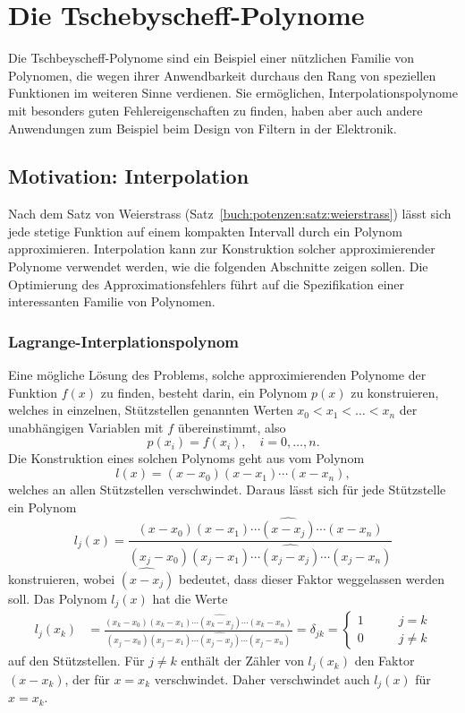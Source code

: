 %
%
%
\section{Die Tschebyscheff-Polynome
\label{buch:polynome:section:tschebyscheff}}
Die Tschbeyscheff-Polynome sind ein Beispiel einer nützlichen Familie
von Polynomen, die wegen ihrer Anwendbarkeit durchaus den Rang von
speziellen Funktionen im weiteren Sinne verdienen.
Sie ermöglichen, Interpolationspolynome mit besonders guten
Fehlereigenschaften zu finden, haben aber auch andere Anwendungen
zum Beispiel beim Design von Filtern in der Elektronik.

%
%
\subsection{Motivation: Interpolation}
Nach dem Satz von Weierstrass
(Satz~\ref{buch:potenzen:satz:weierstrass})
lässt sich jede stetige Funktion auf einem kompakten Intervall durch
ein Polynom approximieren.
Interpolation kann zur Konstruktion solcher approximierender Polynome
verwendet werden, wie die folgenden Abschnitte zeigen sollen.
Die Optimierung des Approximationsfehlers führt auf die Spezifikation
einer interessanten Familie von Polynomen.

%
%
\subsubsection{Lagrange-Interplationspolynom}
Eine mögliche Lösung des Problems, solche approximierenden Polynome
der Funktion $f(x)$
zu finden, besteht darin, ein Polynom $p(x)$ zu konstruieren, welches
in einzelnen, Stützstellen genannten Werten $x_0<x_1<\dots<x_n$ der
unabhängigen Variablen mit $f$ übereinstimmt, also
\[
p(x_i) = f(x_i), \quad i=0,\dots,n.
\]
Die Konstruktion eines solchen Polynoms geht aus vom Polynom
\[
l(x) = (x-x_0)(x-x_1)\cdots(x-x_n),
\]
welches an allen Stützstellen verschwindet.
Daraus lässt sich für jede Stützstelle ein Polynom
\[
l_j(x)
=
\frac{
(x-x_0)(x-x_1)\cdots\widehat{(x-x_j)}\cdots(x-x_n)
}{
(x_j-x_0)(x_j-x_1)\cdots\widehat{(x_j-x_j)}\cdots(x_j-x_n)
}
\]
konstruieren, wobei $\widehat{(x-x_j)}$ bedeutet, dass dieser Faktor
weggelassen werden soll.
Das Polynom $l_j(x)$ hat die Werte
\begin{align}
l_j(x_k)
&=
\frac{
(x_k-x_0)(x_k-x_1)\cdots\widehat{(x_k-x_j)}\cdots(x_k-x_n)
}{
(x_j-x_0)(x_j-x_1)\cdots\widehat{(x_j-x_j)}\cdots(x_j-x_n)
}
=
\delta_{jk}
=
\begin{cases}
1&\qquad j=k\\
0&\qquad j\ne k
\end{cases}
\label{buch:potenzen:interpolation:lj}
\end{align}
auf den Stützstellen.
Für $j\ne k$ enthält der Zähler von $l_j(x_k)$ den Faktor
$(x-x_k)$, der für $x=x_k$ verschwindet.
Daher verschwindet auch $l_j(x)$ für $x=x_k$.

